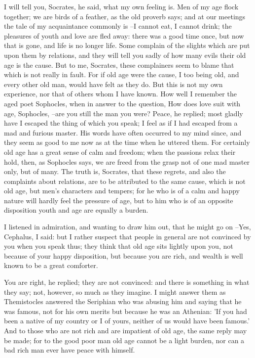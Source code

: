 I will tell you, Socrates, he said, what my own feeling is. Men of my age flock together; we are birds of a feather, as the old proverb says; and at our meetings the tale of my acquaintance commonly is --I cannot eat, I cannot drink; the pleasures of youth and love are fled away: there was a good time once, but now that is gone, and life is no longer life. Some complain of the slights which are put upon them by relations, and they will tell you sadly of how many evils their old age is the cause. But to me, Socrates, these complainers seem to blame that which is not really in fault. For if old age were the cause, I too being old, and every other old man, would have felt as they do. But this is not my own experience, nor that of others whom I have known. How well I remember the aged poet Sophocles, when in answer to the question, How does love suit with age, Sophocles, --are you still the man you were? Peace, he replied; most gladly have I escaped the thing of which you speak; I feel as if I had escaped from a mad and furious master. His words have often occurred to my mind since, and they seem as good to me now as at the time when he uttered them. For certainly old age has a great sense of calm and freedom; when the passions relax their hold, then, as Sophocles says, we are freed from the grasp not of one mad master only, but of many. The truth is, Socrates, that these regrets, and also the complaints about relations, are to be attributed to the same cause, which is not old age, but men's characters and tempers; for he who is of a calm and happy nature will hardly feel the pressure of age, but to him who is of an opposite disposition youth and age are equally a burden.

I listened in admiration, and wanting to draw him out, that he might go on --Yes, Cephalus, I said: but I rather suspect that people in general are not convinced by you when you speak thus; they think that old age sits lightly upon you, not because of your happy disposition, but because you are rich, and wealth is well known to be a great comforter.

You are right, he replied; they are not convinced: and there is something in what they say; not, however, so much as they imagine. I might answer them as Themistocles answered the Seriphian who was abusing him and saying that he was famous, not for his own merits but because he was an Athenian: 'If you had been a native of my country or I of yours, neither of us would have been famous.' And to those who are not rich and are impatient of old age, the same reply may be made; for to the good poor man old age cannot be a light burden, nor can a bad rich man ever have peace with himself.

